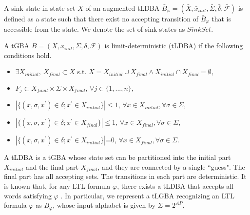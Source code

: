 \begin{definition}
A sink state in state set $X$ of an augmented tLDBA $\bar{B}_{\varphi} = (\bar{X}, \bar{x}_{init},\bar{\Sigma},\bar{\delta},\bar{\mathcal{F}})$ is defined as a state such that there exist no accepting transition of $\bar{B}_{\varphi}$ that is accessible from the state. We denote the set of sink states as $Sink Set$.
\end{definition}

\begin{definition}
  A tGBA $B = (X, x_{init},\Sigma,\delta,\mathcal{F})$ is limit-deterministic (tLDBA) if the following conditions hold.
  \begin{itemize}
    \item $\exists X_{initial},\ X_{final} \subset X$ s.t. $X=X_{initial} \cup X_{final} \land X_{initial} \cap X_{final} = \emptyset$,
    \item $F_j \subset X_{final} \times \Sigma \times X_{final}$, $\forall j \in \{ 1,...,n \}$,
    \item $| \{ (x, \sigma, x^{\prime}) \! \in \! \delta; x^{\prime} \! \in \! X_{initial} \} | \! \leq \! 1$, $\forall x \! \in \! X_{initial}, \forall \sigma \! \in \! \Sigma$,
    \item $| \{ (x, \sigma, x^{\prime}) \in \delta; x^{\prime} \in X_{final} \} | \! \leq \! 1$, $\forall x \! \in \! X_{final}, \forall \sigma \! \in \! \Sigma$,
    \item $| \{ (x, \sigma, x^{\prime}) \in \delta; x^{\prime} \in X_{initial} \} |$=0, $\forall x \! \in \! X_{final}, \forall \sigma \! \in \! \Sigma$.
  \end{itemize}
\end{definition}
A tLDBA is a tGBA whose state set can be partitioned into the initial part $X_{initial}$ and the final part $X_{final}$, and they are connected by a single ``guess". The final part has all accepting sets. The transitions in each part are deterministic.
It is known that, for any LTL formula $ \varphi $, there exists a tLDBA that accepts all words satisfying $\varphi$ \cite{SEJK2016}.
In particular, we represent a tLGBA recognizing an LTL formula $\varphi$ as $B_{\varphi}$, whose input alphabet is given by $ \Sigma = 2^{AP} $.
